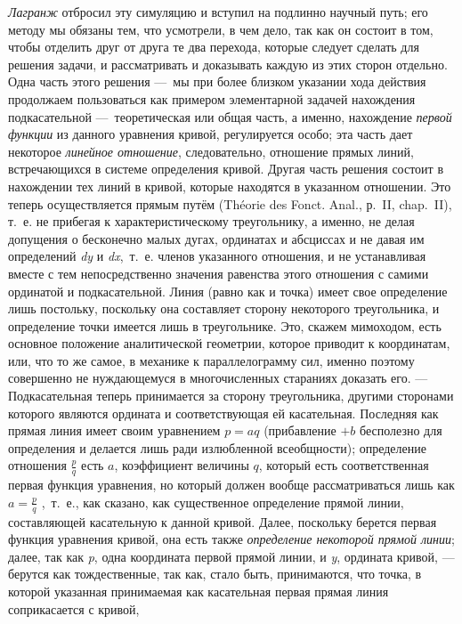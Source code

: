 {\em Лагранж} отбросил эту симуляцию и вступил на
подлинно научный путь; его методу мы обязаны тем, что усмотрели, в чем
дело, так как он состоит в том, чтобы отделить друг от друга те два
перехода, которые следует сделать для решения задачи, и рассматривать и
доказывать каждую из этих сторон отдельно. Одна часть этого решения —~мы
при более близком указании хода действия продолжаем пользоваться как
примером элементарной задачей нахождения подкасательной —~теоретическая или
общая часть, а именно, нахождение {\em первой функции}
из данного уравнения кривой, регулируется особо; эта часть дает некоторое
{\em линейное отношение}, следовательно, отношение
прямых линий, встречающихся в системе определения кривой. Другая часть
решения состоит в нахождении тех линий в кривой, которые находятся в
указанном отношении. Это теперь осуществляется прямым путём
(Théorie des Fonct. Anal., р.~II, chap.~II), т.~е. не
прибегая к характеристическому треугольнику, а именно, не делая допущения о
бесконечно малых дугах, ординатах и абсциссах и не давая им определений
{\em dy} и {\em dx},~т.~е. членов
указанного отношения, и не устанавливая вместе с тем непосредственно
значения равенства этого отношения с самими ординатой и подкасательной.
Линия (равно как и точка) имеет свое определение лишь постольку, поскольку
она составляет сторону некоторого треугольника, и определение точки имеется
лишь в треугольнике. Это, скажем мимоходом, есть основное положение
аналитической геометрии, которое приводит к координатам, или, что то же
самое, в механике к параллелограмму сил, именно поэтому совершенно не
нуждающемуся в многочисленных стараниях доказать его. — Подкасательная
теперь принимается за сторону треугольника, другими сторонами которого
являются ордината и соответствующая ей касательная. Последняя как прямая
линия имеет своим уравнением  $p=\mathit{aq}$  (прибавление
$+b$ бесполезно для определения и делается лишь
ради излюбленной всеобщности); определение отношения  $\frac p q$  есть
$a$, коэффициент величины
$q$, который есть соответственная первая функция
уравнения, но который должен вообще рассматриваться лишь как  $a=\frac p q$
,~т.~е., как сказано, как существенное определение прямой линии,
составляющей касательную к данной кривой. Далее, поскольку берется первая
функция уравнения кривой, она есть также
{\em определение некоторой прямой линии}; далее, так
как {\em p}, одна координата первой прямой линии, и
{\em y}, ордината кривой, — берутся как тождественные,
так как, стало быть, принимаются, что точка, в которой указанная
принимаемая как касательная первая прямая линия соприкасается с кривой,
